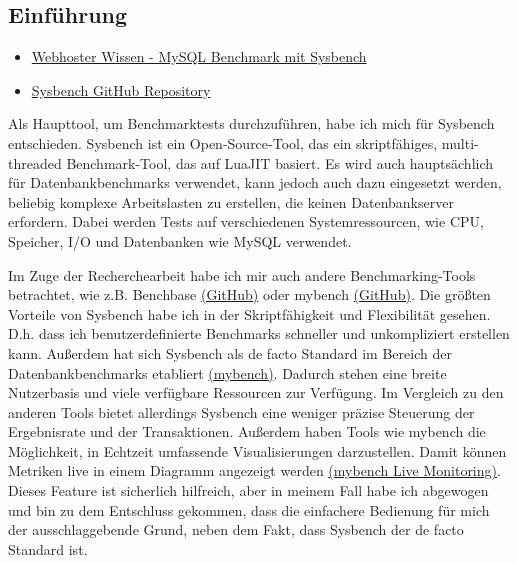 \subsection{Einführung}\label{subsec:einfuhrung}

\begin{itemize}
    \item \href{https://www.webhosterwissen.de/know-how/server/mysql-benchmark-mittels-sysbench/}{Webhoster Wissen - MySQL Benchmark mit Sysbench}
    \item \href{https://github.com/akopytov/sysbench}{Sysbench GitHub Repository}
\end{itemize}

Als Haupttool, um Benchmarktests durchzuführen, habe ich mich für Sysbench entschieden. Sysbench ist ein Open-Source-Tool, das ein skriptfähiges, multi-threaded Benchmark-Tool, das auf LuaJIT basiert. Es wird auch hauptsächlich für Datenbankbenchmarks verwendet, kann jedoch auch dazu eingesetzt werden, beliebig komplexe Arbeitslasten zu erstellen, die keinen Datenbankserver erfordern. Dabei werden Tests auf verschiedenen Systemressourcen, wie CPU, Speicher, I/O und Datenbanken wie MySQL verwendet.

Im Zuge der Recherchearbeit habe ich mir auch andere Benchmarking-Tools betrachtet, wie z.B. Benchbase \href{https://github.com/cmu-db/benchbase}{(GitHub)} oder mybench \href{https://github.com/Shopify/mybench}{(GitHub)}. Die größten Vorteile von Sysbench habe ich in der Skriptfähigkeit und Flexibilität gesehen. D.h. dass ich benutzerdefinierte Benchmarks schneller und unkompliziert erstellen kann. Außerdem hat sich Sysbench als de facto Standard im Bereich der Datenbankbenchmarks etabliert \href{https://shopify.github.io/mybench/introduction.html}{(mybench)}. Dadurch stehen eine breite Nutzerbasis und viele verfügbare Ressourcen zur Verfügung. Im Vergleich zu den anderen Tools bietet allerdings Sysbench eine weniger präzise Steuerung der Ergebnisrate und der Transaktionen. Außerdem haben Tools wie mybench die Möglichkeit, in Echtzeit umfassende Visualisierungen darzustellen. Damit können Metriken live in einem Diagramm angezeigt werden \href{https://shopify.github.io/mybench/detailed-design-doc.html#live-monitoring-user-interface}{(mybench Live Monitoring)}. Dieses Feature ist sicherlich hilfreich, aber in meinem Fall habe ich abgewogen und bin zu dem Entschluss gekommen, dass die einfachere Bedienung für mich der ausschlaggebende Grund, neben dem Fakt, dass Sysbench der de facto Standard ist.

